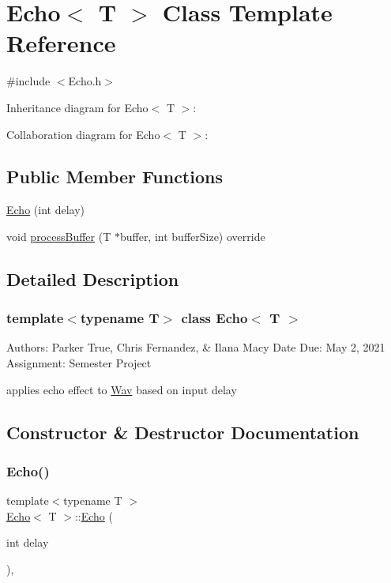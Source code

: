 \hypertarget{classEcho}{}\section{Echo$<$ T $>$ Class Template Reference}
\label{classEcho}


{\ttfamily \#include $<$Echo.\+h$>$}



Inheritance diagram for Echo$<$ T $>$\+:


Collaboration diagram for Echo$<$ T $>$\+:
\subsection*{Public Member Functions}
\begin{DoxyCompactItemize}
\item 
\hyperlink{classEcho_af348cd7f23248e72046c5d006d3adca7}{Echo} (int delay)
\item 
void \hyperlink{classEcho_af5ea3baaa51600cf111f21f931895b46}{process\+Buffer} (T $\ast$buffer, int buffer\+Size) override
\end{DoxyCompactItemize}


\subsection{Detailed Description}
\subsubsection*{template$<$typename T$>$\newline
class Echo$<$ T $>$}

Authors\+: Parker True, Chris Fernandez, \& Ilana Macy Date Due\+: May 2, 2021 Assignment\+: Semester Project

applies echo effect to \hyperlink{classWav}{Wav} based on input delay 

\subsection{Constructor \& Destructor Documentation}
\mbox{\label{classEcho_af348cd7f23248e72046c5d006d3adca7}} 
\subsubsection{\texorpdfstring{Echo()}{Echo()}}
{\footnotesize\ttfamily template$<$typename T $>$ \\
\hyperlink{classEcho}{Echo}$<$ T $>$\+::\hyperlink{classEcho}{Echo} (\begin{DoxyParamCaption}\item[{int}]{delay }\end{DoxyParamCaption})\hspace{0.3cm}{\ttfamily [inline]}, {\ttfamily [explicit]}}

